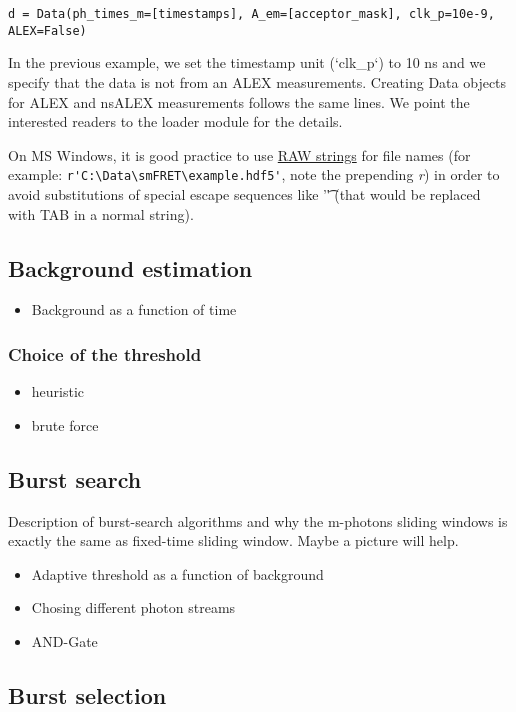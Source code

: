 \verb|d = Data(ph_times_m=[timestamps], A_em=[acceptor_mask], clk_p=10e-9, ALEX=False)|

In the previous example, we set the timestamp unit (`clk_p`) to 10 ns and we specify that the data is not from an ALEX measurements. Creating Data objects for ALEX and nsALEX measurements follows the same lines. We point the interested readers to the loader module for the details.

On MS Windows, it is good practice to use \href{https://docs.python.org/2/tutorial/introduction.html#strings}{RAW strings} for file names (for example: \verb|r'C:\Data\smFRET\example.hdf5'|, note the prepending \textit{r}) in order to avoid substitutions of special escape sequences like '\t' (that would be replaced with TAB in a normal string).

\subsection{Background estimation}
\begin{itemize}
\item Background as a function of time
\end{itemize}

\subsubsection{Choice of the threshold}
\begin{itemize}
\item heuristic
\item brute force
\end{itemize}

\subsection{Burst search}

Description of burst-search algorithms and why the m-photons sliding windows is exactly the same as fixed-time sliding window. Maybe a picture will help.

\begin{itemize}
\item Adaptive threshold as a function of background
\item Chosing different photon streams
\item AND-Gate
\end{itemize}

\subsection{Burst selection}

